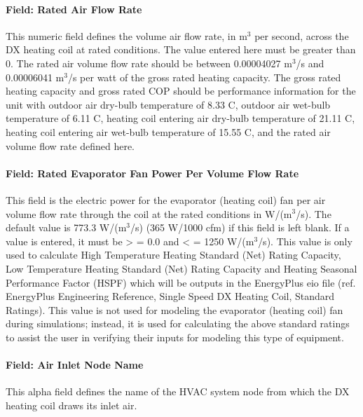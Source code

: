 \paragraph{Field: Rated Air Flow Rate}\label{field-rated-air-flow-rate-4}

This numeric field defines the volume air flow rate, in m\(^{3}\) per second, across the DX heating coil at rated conditions. The value entered here must be greater than 0. The rated air volume flow rate should be between 0.00004027 m\(^{3}\)/s and 0.00006041 m\(^{3}\)/s per watt of the gross rated heating capacity. The gross rated heating capacity and gross rated COP should be performance information for the unit with outdoor air dry-bulb temperature of 8.33 C, outdoor air wet-bulb temperature of 6.11 C, heating coil entering air dry-bulb temperature of 21.11 C, heating coil entering air wet-bulb temperature of 15.55 C, and the rated air volume flow rate defined here.

\paragraph{Field: Rated Evaporator Fan Power Per Volume Flow Rate}\label{field-rated-evaporator-fan-power-per-volume-flow-rate-1}

This field is the electric power for the evaporator (heating coil) fan per air volume flow rate through the coil at the rated conditions in W/(m\(^{3}\)/s). The default value is 773.3 W/(m\(^{3}\)/s) (365 W/1000 cfm) if this field is left blank. If a value is entered, it must be \textgreater{} = 0.0 and \textless{} = 1250 W/(m\(^{3}\)/s). This value is only used to calculate High Temperature Heating Standard (Net) Rating Capacity, Low Temperature Heating Standard (Net) Rating Capacity and Heating Seasonal Performance Factor (HSPF) which will be outputs in the EnergyPlus eio file (ref. EnergyPlus Engineering Reference, Single Speed DX Heating Coil, Standard Ratings). This value is not used for modeling the evaporator (heating coil) fan during simulations; instead, it is used for calculating the above standard ratings to assist the user in verifying their inputs for modeling this type of equipment.

\paragraph{Field: Air Inlet Node Name}\label{field-air-inlet-node-name-13}

This alpha field defines the name of the HVAC system node from which the DX heating coil draws its inlet air.

